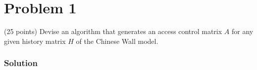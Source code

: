 
\section*{Problem 1}
(25 points) Devise an algorithm that generates an access control matrix $A$ for any given history matrix $H$ of the Chinese Wall model.

\subsubsection*{Solution}
